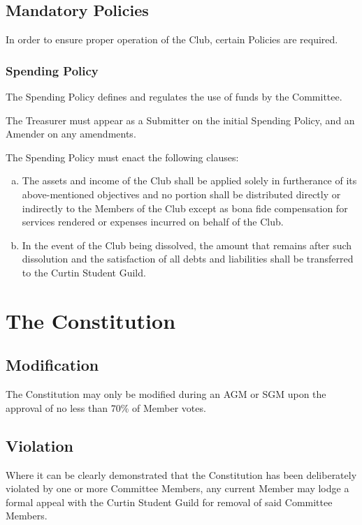 \documentclass[a4paper,12pt]{article}
\begin{document}
\subsection{Mandatory Policies}

In order to ensure proper operation of the Club, certain Policies are required.

\subsubsection{Spending Policy}

The Spending Policy defines and regulates the use of funds by the Committee.

The Treasurer must appear as a Submitter on the initial Spending Policy, and an Amender on any amendments.

The Spending Policy must enact the following clauses:
\begin{enumerate}[a)]
	\item The assets and income of the Club shall be applied solely in furtherance of its above-mentioned objectives and no portion shall be distributed directly or indirectly to the Members of the Club except as bona fide compensation for services rendered or expenses incurred on behalf of the Club.
	\item In the event of the Club being dissolved, the amount that remains after such dissolution and the satisfaction of all debts and liabilities shall be transferred to the Curtin Student Guild.
\end{enumerate}

\section{The Constitution}

\subsection{Modification}

The Constitution may only be modified during an AGM or SGM upon the approval of no less than 70\% of Member votes.

\subsection{Violation}

Where it can be clearly demonstrated that the Constitution has been deliberately violated by one or more Committee Members, any current Member may lodge a formal appeal with the Curtin Student Guild for removal of said Committee Members.
\end{document}
